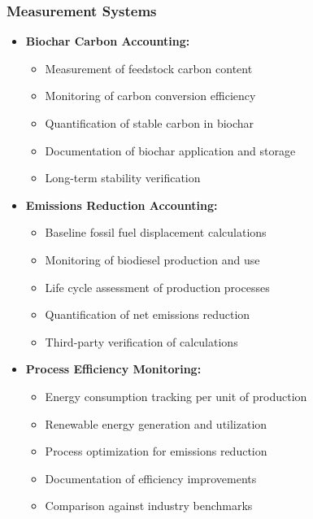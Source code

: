 \subsubsection{Measurement Systems}
\begin{itemize}
    \item \textbf{Biochar Carbon Accounting:}
    \begin{itemize}
        \item Measurement of feedstock carbon content
        \item Monitoring of carbon conversion efficiency
        \item Quantification of stable carbon in biochar
        \item Documentation of biochar application and storage
        \item Long-term stability verification
    \end{itemize}
    
    \item \textbf{Emissions Reduction Accounting:}
    \begin{itemize}
        \item Baseline fossil fuel displacement calculations
        \item Monitoring of biodiesel production and use
        \item Life cycle assessment of production processes
        \item Quantification of net emissions reduction
        \item Third-party verification of calculations
    \end{itemize}
    
    \item \textbf{Process Efficiency Monitoring:}
    \begin{itemize}
        \item Energy consumption tracking per unit of production
        \item Renewable energy generation and utilization
        \item Process optimization for emissions reduction
        \item Documentation of efficiency improvements
        \item Comparison against industry benchmarks
    \end{itemize}
\end{itemize}

